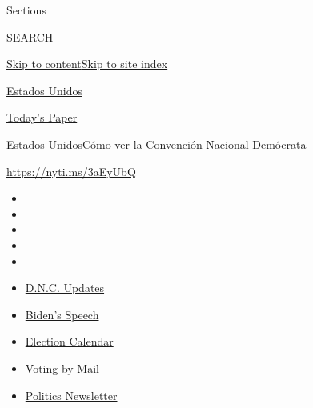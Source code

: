 Sections

SEARCH

\protect\hyperlink{site-content}{Skip to
content}\protect\hyperlink{site-index}{Skip to site index}

\href{https://www.nytimes3xbfgragh.onion/es/section/estados-unidos}{Estados
Unidos}

\href{https://myaccount.nytimes3xbfgragh.onion/auth/login?response_type=cookie\&client_id=vi}{}

\href{https://www.nytimes3xbfgragh.onion/section/todayspaper}{Today's
Paper}

\href{/es/section/estados-unidos}{Estados Unidos}\textbar{}Cómo ver la
Convención Nacional Demócrata

\url{https://nyti.ms/3aEyUbQ}

\begin{itemize}
\item
\item
\item
\item
\item
\end{itemize}

\begin{itemize}
\item
  \href{https://www.nytimes3xbfgragh.onion/live/2020/08/20/us/dnc-convention-election?action=click\&pgtype=Article\&state=default\&region=TOP_BANNER\&context=storylines_menu}{D.N.C.
  Updates}
\item
  \href{https://www.nytimes3xbfgragh.onion/2020/08/20/us/politics/biden-presidential-nomination-dnc.html?action=click\&pgtype=Article\&state=default\&region=TOP_BANNER\&context=storylines_menu}{Biden's
  Speech}
\item
  \href{https://www.nytimes3xbfgragh.onion/interactive/2019/us/elections/2020-presidential-election-calendar.html?action=click\&pgtype=Article\&state=default\&region=TOP_BANNER\&context=storylines_menu}{Election
  Calendar}
\item
  \href{https://www.nytimes3xbfgragh.onion/interactive/2020/08/11/us/politics/vote-by-mail-us-states.html?action=click\&pgtype=Article\&state=default\&region=TOP_BANNER\&context=storylines_menu}{Voting
  by Mail}
\item
  \href{https://www.nytimes3xbfgragh.onion/newsletters/politics?action=click\&pgtype=Article\&state=default\&region=TOP_BANNER\&context=storylines_menu}{Politics
  Newsletter}
\end{itemize}

